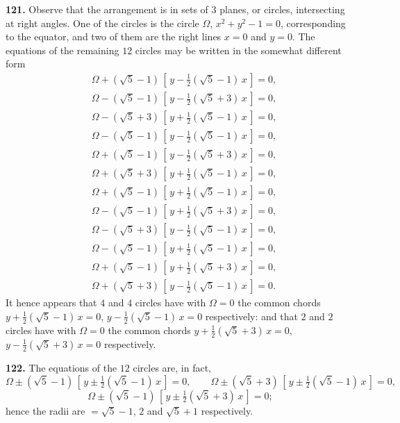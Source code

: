 \documentclass[11pt]{article}
\newcommand{\artno}[1]{\textbf{#1.}\quad}
\begin{document}
\medskip
\noindent
\artno{121} Observe that the arrangement is in sets of $3$ planes, or
circles, intersecting at right angles. One of the circles is the circle
$\Omega$, $x^{2} + y^{2} - 1 = 0$, corresponding to the equator, and two of
them are the right lines $x = 0$ and $y = 0$. The equations of the
remaining $12$ circles may be written in the somewhat different form
\begin{align*}
  &\Omega + (\sqrt{5} - 1)\,[\,y - \tfrac{1}{2}(\sqrt{5} - 1)\,x\,] = 0,\\
  &\Omega - (\sqrt{5} - 1)\,[\,y - \tfrac{1}{2}(\sqrt{5} + 3)\,x\,] = 0,\\
  &\Omega - (\sqrt{5} + 3)\,[\,y + \tfrac{1}{2}(\sqrt{5} - 1)\,x\,] = 0,\\
  &\Omega - (\sqrt{5} - 1)\,[\,y - \tfrac{1}{2}(\sqrt{5} - 1)\,x\,] = 0,\\
  &\Omega + (\sqrt{5} - 1)\,[\,y - \tfrac{1}{2}(\sqrt{5} + 3)\,x\,] = 0,\\
  &\Omega + (\sqrt{5} + 3)\,[\,y + \tfrac{1}{2}(\sqrt{5} - 1)\,x\,] = 0,\\
  &\Omega + (\sqrt{5} - 1)\,[\,y + \tfrac{1}{2}(\sqrt{5} - 1)\,x\,] = 0,\\
  &\Omega - (\sqrt{5} - 1)\,[\,y + \tfrac{1}{2}(\sqrt{5} + 3)\,x\,] = 0,\\
  &\Omega - (\sqrt{5} + 3)\,[\,y - \tfrac{1}{2}(\sqrt{5} - 1)\,x\,] = 0,\\
  &\Omega - (\sqrt{5} - 1)\,[\,y + \tfrac{1}{2}(\sqrt{5} - 1)\,x\,] = 0,\\
  &\Omega + (\sqrt{5} - 1)\,[\,y + \tfrac{1}{2}(\sqrt{5} + 3)\,x\,] = 0,\\
  &\Omega + (\sqrt{5} + 3)\,[\,y - \tfrac{1}{2}(\sqrt{5} - 1)\,x\,] = 0.
\end{align*}
It hence appears that $4$ and $4$ circles have with $\Omega = 0$ the common
chords $y + \tfrac{1}{2}(\sqrt{5} - 1)\,x = 0$,
$y - \tfrac{1}{2}(\sqrt{5} - 1)\,x = 0$ respectively: and that $2$ and $2$
circles have with $\Omega = 0$ the common chords
$y + \tfrac{1}{2}(\sqrt{5} + 3)\,x = 0$,
$y - \tfrac{1}{2}(\sqrt{5} + 3)\,x = 0$ respectively.

\bigskip
\noindent
\artno{122} The equations of the $12$ circles are, in fact,
\[
  \Omega \pm (\sqrt{5} - 1)\,[\,y \pm \tfrac{1}{2}(\sqrt{5} - 1)\,x\,] = 0,
  \qquad
  \Omega \pm (\sqrt{5} + 3)\,[\,y \pm \tfrac{1}{2}(\sqrt{5} - 1)\,x\,] = 0,
\]
\[
  \Omega \pm (\sqrt{5} - 1)\,[\,y \pm \tfrac{1}{2}(\sqrt{5} + 3)\,x\,] = 0;
\]
hence the radii are $= \sqrt{5} - 1$, $2$ and $\sqrt{5} + 1$ respectively.
\end{document}
